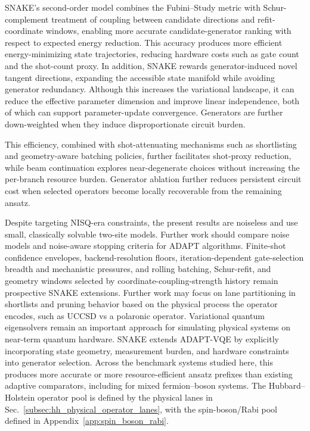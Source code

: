\documentclass[
  reprint,
  amsmath,
  amssymb,
  aps,
  pra,
  nofootinbib,
  superscriptaddress,
  floatfix
]{revtex4-2}
\begin{document}
SNAKE's second-order model combines the Fubini--Study metric with Schur-complement treatment of coupling between candidate directions and refit-coordinate windows, enabling more accurate candidate-generator ranking with respect to expected energy reduction. This accuracy produces more efficient energy-minimizing state trajectories, reducing hardware costs such as gate count and the shot-count proxy. In addition, SNAKE rewards generator-induced novel tangent directions, expanding the accessible state manifold while avoiding generator redundancy. Although this increases the variational landscape, it can reduce the effective parameter dimension and improve linear independence, both of which can support parameter-update convergence. Generators are further down-weighted when they induce disproportionate circuit burden.

This efficiency, combined with shot-attenuating mechanisms such as shortlisting and geometry-aware batching policies, further facilitates shot-proxy reduction, while beam continuation explores near-degenerate choices without increasing the per-branch resource burden. Generator ablation further reduces persistent circuit cost when selected operators become locally recoverable from the remaining ansatz.

Despite targeting NISQ-era constraints, the present results are noiseless and use small, classically solvable two-site models. Further work should compare noise models and noise-aware stopping criteria for ADAPT algorithms. Finite-shot confidence envelopes, backend-resolution floors, iteration-dependent gate-selection breadth and mechanistic pressures, and rolling batching, Schur-refit, and geometry windows selected by coordinate-coupling-strength history remain prospective SNAKE extensions. Further work may focus on lane partitioning in shortlists and pruning behavior based on the physical process the operator encodes, such as UCCSD vs a polaronic operator.
Variational quantum eigensolvers remain an important approach for simulating physical systems on near-term quantum hardware. SNAKE extends ADAPT-VQE by explicitly incorporating state geometry, measurement burden, and hardware constraints into generator selection. Across the benchmark systems studied here, this produces more accurate or more resource-efficient ansatz prefixes than existing adaptive comparators, including for mixed fermion--boson systems. The Hubbard--Holstein operator pool is defined by the physical lanes in Sec.~\ref{subsec:hh_physical_operator_lanes}, with the spin-boson/Rabi pool defined in Appendix~\ref{app:spin_boson_rabi}.
\end{document}
